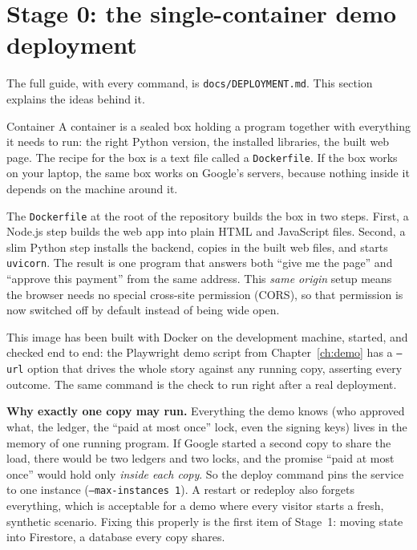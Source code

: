 \documentclass[11pt]{report}
\newcommand{\file}[1]{\texttt{#1}}
\newcommand{\code}[1]{\texttt{#1}}
\begin{document}
\section{Stage 0: the single-container demo deployment}
\label{sec:stage0}

The full guide, with every command, is \file{docs/DEPLOYMENT.md}. This
section explains the ideas behind it.

\begin{concept}{Container}
A container is a sealed box holding a program together with everything it
needs to run: the right Python version, the installed libraries, the built
web page. The recipe for the box is a text file called a
\file{Dockerfile}. If the box works on your laptop, the same box works on
Google's servers, because nothing inside it depends on the machine around
it.
\end{concept}

The \file{Dockerfile} at the root of the repository builds the box in two
steps. First, a Node.js step builds the web app into plain HTML and
JavaScript files. Second, a slim Python step installs the backend, copies
in the built web files, and starts \code{uvicorn}. The result is one
program that answers both ``give me the page'' and ``approve this
payment'' from the same address. This \emph{same origin} setup means the
browser needs no special cross-site permission (CORS), so that permission
is now switched off by default instead of being wide open.

This image has been built with Docker on the development machine, started,
and checked end to end: the Playwright demo script from
Chapter~\ref{ch:demo} has a \code{--url} option that drives the whole
story against any running copy, asserting every outcome. The same command
is the check to run right after a real deployment.

\begin{whyitmatters}
\textbf{Why exactly one copy may run.} Everything the demo knows (who
approved what, the ledger, the ``paid at most once'' lock, even the signing
keys) lives in the memory of one running program. If Google started a
second copy to share the load, there would be two ledgers and two locks,
and the promise ``paid at most once'' would hold only \emph{inside each
copy}. So the deploy command pins the service to one instance
(\code{--max-instances 1}). A restart or redeploy also forgets everything,
which is acceptable for a demo where every visitor starts a fresh,
synthetic scenario. Fixing this properly is the first item of Stage~1:
moving state into Firestore, a database every copy shares.
\end{whyitmatters}
\end{document}
